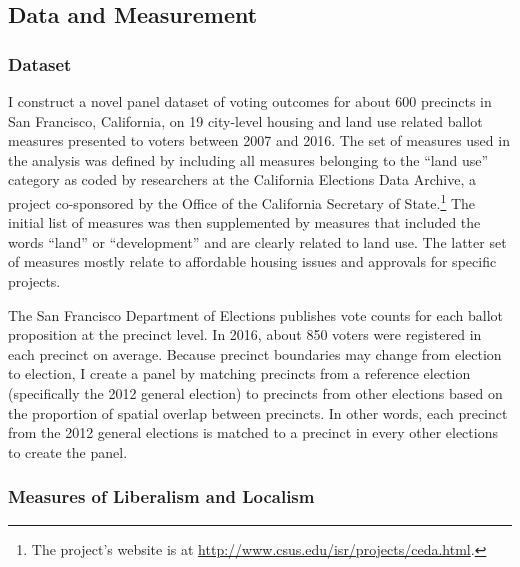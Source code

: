 \documentclass[article,12pt]{memoir}
\begin{document}
\subsection{Data and Measurement}

\subsubsection{Dataset}

I construct a novel panel dataset of voting outcomes for about 600 precincts in San Francisco, California, on 19 city-level housing and land use related ballot measures presented to voters between 2007 and 2016. The set of measures used in the analysis was defined by including all measures belonging to the ``land use'' category as coded by researchers at the California Elections Data Archive, a project co-sponsored by the Office of the California Secretary of State.\footnote{The project's website is at \url{http://www.csus.edu/isr/projects/ceda.html}.} The initial list of measures was then supplemented by measures that included the words ``land'' or ``development'' and are clearly related to land use. The latter set of measures mostly relate to affordable housing issues and approvals for specific projects.

The San Francisco Department of Elections publishes vote counts for each ballot proposition at the precinct level. In 2016, about 850 voters were registered in each precinct on average. Because precinct boundaries may change from election to election, I create a panel by matching precincts from a reference election (specifically the 2012 general election) to precincts from other elections based on the proportion of spatial overlap between precincts. In other words, each precinct from the 2012 general elections is matched to a precinct in every other elections to create the panel.

\subsubsection{Measures of Liberalism and Localism}
\end{document}
